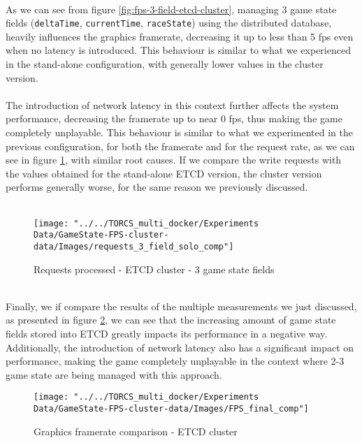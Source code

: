 \\ As we can see from figure \ref{fig:fps-3-field-etcd-cluster}, managing 3 game state fields (\texttt{deltaTime}, \texttt{currentTime}, \texttt{raceState}) using the distributed database, heavily influences the graphics framerate, decreasing it up to less than 5 fps even when no latency is introduced. This behaviour is similar to what we experienced in the stand-alone configuration, with generally lower values in the cluster version. \\ \\
The introduction of network latency in this context further affects the system performance, decreasing the framerate up to near 0 fps, thus making the game completely unplayable. This behaviour is similar to what we experimented in the previous configuration, for both the framerate and for the request rate, as we can see in figure \ref{fig:requests-3-field-etcd-cluster}, with similar root causes. If we compare the write requests with the values obtained for the stand-alone ETCD version, the cluster version performs generally worse, for the same reason we previously discussed. \\ \\
\begin{figure}[h!]
	\centering
	\texttt{[image: "../../TORCS\_multi\_docker/Experiments Data/GameState-FPS-cluster-data/Images/requests\_3\_field\_solo\_comp"]}
	\caption[Requests processed - ETCD stand-alone - 3 game state fields]{Requests processed - ETCD cluster - 3 game state fields}
	\label{fig:requests-3-field-etcd-cluster}
\end{figure}
\pagebreak
\\ Finally, we if compare the results of the multiple measurements we just discussed, as presented in figure \ref{fig:fps-comparison-etcd-cluster}, we can see that the increasing amount of game state fields stored into ETCD greatly impacts its performance in a negative way. Additionally, the introduction of network latency also has a significant impact on performance, making the game completely unplayable in the context where 2-3 game state are being managed with this approach. \\
\begin{figure}[h!]
	\centering
	\texttt{[image: "../../TORCS\_multi\_docker/Experiments Data/GameState-FPS-cluster-data/Images/FPS\_final\_comp"]}
	\caption[Graphics framerate comparison - ETCD cluster]{Graphics framerate comparison - ETCD cluster}
	\label{fig:fps-comparison-etcd-cluster}
\end{figure}
